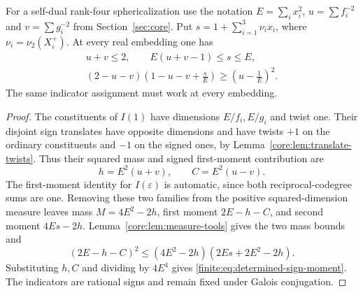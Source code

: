 \begin{proposition}
\label{finite:prop:signed-translate-moment}
For a self-dual rank-four sphericalization use the notation
$E=\sum_i x_i^2$, $u=\sum f_i^{-2}$ and $v=\sum g_i^{-2}$ from
Section~\ref{sec:core}. Put $s=1+\sum_{i=1}^3\nu_i x_i$, where
$\nu_i=\nu_2(X_i^+)$. At every real embedding one has
\begin{gather}
 u+v\le2,\qquad E(u+v-1)\le s\le E,\label{finite:eq:sign-mass}\\
 (2-u-v)\left(1-u-v+\frac{s}{E}\right)
          \ge\left(u-\frac1E\right)^2.
 \label{finite:eq:determined-sign-moment}
\end{gather}
The same indicator assignment must work at every embedding.
\end{proposition}
\begin{proof}
The constituents of $I(1)$ have dimensions $E/f_i,E/g_i$ and twist
one. Their disjoint sign translates have opposite dimensions and
have twists $+1$ on the ordinary constituents and $-1$ on the signed
ones, by Lemma~\ref{core:lem:translate-twists}.
Thus their squared mass and signed first-moment contribution are
\[
 h=E^2(u+v),\qquad C=E^2(u-v).
\]
The first-moment identity for $I(\varepsilon)$ is automatic, since
both reciprocal-codegree sums are one. Removing these two families
from the positive squared-dimension measure leaves mass
$M=4E^2-2h$, first moment $2E-h-C$, and second moment $4Es-2h$.
Lemma~\ref{core:lem:measure-tools} gives the two mass bounds and
\[
 (2E-h-C)^2\le(4E^2-2h)(2Es+2E^2-2h).
\]
Substituting $h,C$ and dividing by $4E^4$ gives
\eqref{finite:eq:determined-sign-moment}. The indicators are rational
signs and remain fixed under Galois conjugation.
\end{proof}

